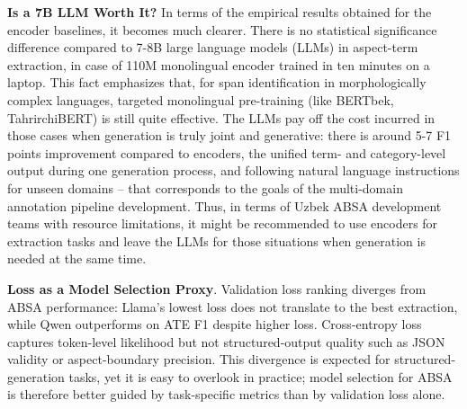 \documentclass[bdcc,article,submit,moreauthors]{Definitions/mdpi}
\begin{document}
\textbf{Is a 7B LLM Worth It?} In terms of the empirical results obtained for the encoder baselines, it becomes much clearer. There is no statistical significance difference compared to 7-8B large language models (LLMs) in aspect-term extraction, in case of 110M monolingual encoder trained in ten minutes on a laptop. This fact emphasizes that, for span identification in morphologically complex languages, targeted monolingual pre-training (like BERTbek, TahrirchiBERT) is still quite effective. The LLMs pay off the cost incurred in those cases when generation is truly joint and generative: there is around 5-7 F1 points improvement compared to encoders, the unified term- and category-level output during one generation process, and following natural language instructions for unseen domains – that corresponds to the goals of the multi-domain annotation pipeline development. Thus, in terms of Uzbek ABSA development teams with resource limitations, it might be recommended to use encoders for extraction tasks and leave the LLMs for those situations when generation is needed at the same time.

\textbf{Loss as a Model Selection Proxy}. Validation loss ranking diverges from ABSA performance: Llama's lowest loss does not translate to the best extraction, while Qwen outperforms on ATE F1 despite higher loss. Cross-entropy loss captures token-level likelihood but not structured-output quality such as JSON validity or aspect-boundary precision. This divergence is expected for structured-generation tasks, yet it is easy to overlook in practice; model selection for ABSA is therefore better guided by task-specific metrics than by validation loss alone.
\end{document}
